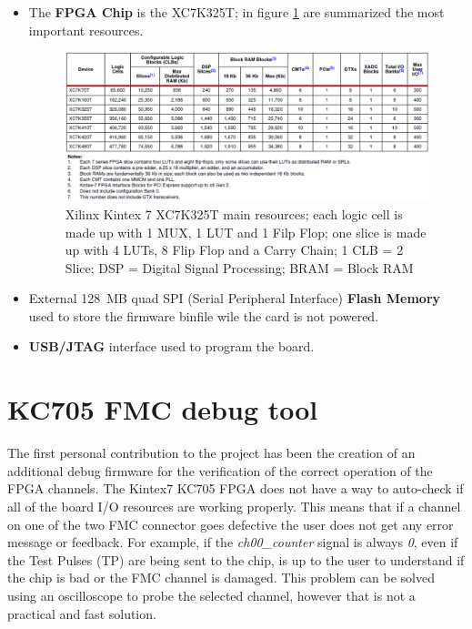 \begin{itemize}
	\item The \textbf{FPGA Chip} is the XC7K325T; in figure \ref{fig:kintex7} are summarized the most important resources.
	\begin{figure}[H]
		\centering
		\includegraphics[width=0.9\linewidth]{IMG/ch3/KINTEX7}
		\caption{Xilinx Kintex 7 XC7K325T main resources; each logic cell is made up with 1 MUX, 1 LUT and 1 Filp Flop; one slice is made up with 4 LUTs, 8 Flip Flop and a Carry Chain; 1 CLB = 2 Slice; DSP = Digital Signal Processing; BRAM = Block RAM}
		\label{fig:kintex7}
	\end{figure}
	\item External 128~MB quad SPI (Serial Peripheral Interface) \textbf{Flash Memory} used to store the firmware binfile wile the card is not powered.
	\item \textbf{USB/JTAG} interface used to program the board.
	
\end{itemize}

\section{KC705 FMC debug tool}
\noindent The first personal contribution to the project has been the creation of an additional debug firmware for the verification of the correct operation of the FPGA channels. 
\newline
The Kintex7 KC705 FPGA does not have a way to auto-check if all of the board I/O resources are working properly.
This means that if a channel on one of the two FMC connector goes defective the user does not get any error message or feedback.
For example, if the \textit{ch00\_counter} signal is always \textit{0}, even if the Test Pulses (TP) are being sent to the chip, is up to the user to understand if the chip is bad or the FMC channel is damaged.
This problem can be solved using an oscilloscope to probe the selected channel, however that is not a practical and fast solution.
